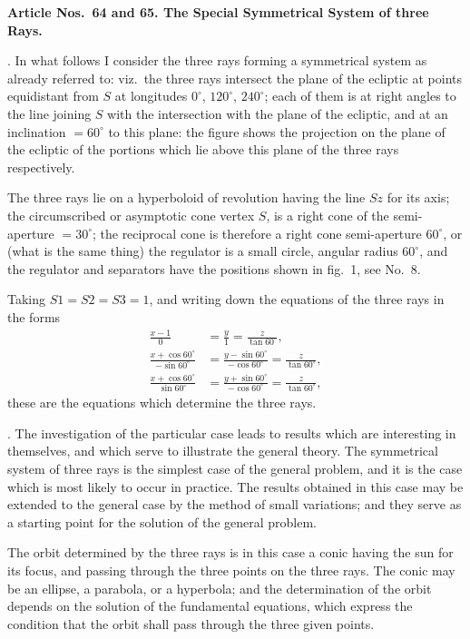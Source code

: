 \documentclass[11pt,a4paper]{article}
\theoremstyle{definition}
\begin{document}
\newpage
\noindent
\textbf{Article Nos.~64 and 65. The Special Symmetrical System of three Rays.}

\smallskip

. In what follows I consider the three rays forming a symmetrical system as already
referred to: viz.~the three rays intersect the plane of the ecliptic at points equidistant
from $S$ at longitudes $0^\circ$, $120^\circ$, $240^\circ$; each of them is at right angles to the line
joining $S$ with the intersection with the plane of the ecliptic, and at an inclination $=60^\circ$
to this plane: the figure shows the projection on the plane of the ecliptic of the portions
which lie above this plane of the three rays respectively.

The three rays lie on a hyperboloid of revolution having the line $Sz$ for its axis;
the circumscribed or asymptotic cone vertex $S$, is a right cone of the semi-aperture $=30^\circ$;
the reciprocal cone is therefore a right cone semi-aperture $60^\circ$, or (what is the same thing)
the regulator is a small circle, angular radius $60^\circ$, and the regulator and separators have
the positions shown in fig.~1, see No.~8.

Taking $S1=S2=S3=1$, and writing down the equations of the three rays in the forms
\begin{align*}
\frac{x-1}{0} &= \frac{y}{1} = \frac{z}{\tan 60^\circ}, \\
\frac{x+\cos 60^\circ}{-\sin 60^\circ} &= \frac{y-\sin 60^\circ}{-\cos 60^\circ} = \frac{z}{\tan 60^\circ}, \\
\frac{x+\cos 60^\circ}{\sin 60^\circ} &= \frac{y+\sin 60^\circ}{-\cos 60^\circ} = \frac{z}{\tan 60^\circ},
\end{align*}
these are the equations which determine the three rays.

\newpage
{}. The investigation of the particular case leads to results which are interesting in
themselves, and which serve to illustrate the general theory. The symmetrical system
of three rays is the simplest case of the general problem, and it is the case which is most
likely to occur in practice. The results obtained in this case may be extended to the
general case by the method of small variations; and they serve as a starting point for
the solution of the general problem.

The orbit determined by the three rays is in this case a conic having the sun for its
focus, and passing through the three points on the three rays. The conic may be an
ellipse, a parabola, or a hyperbola; and the determination of the orbit depends on the
solution of the fundamental equations, which express the condition that the orbit shall
pass through the three given points.
\end{document}
